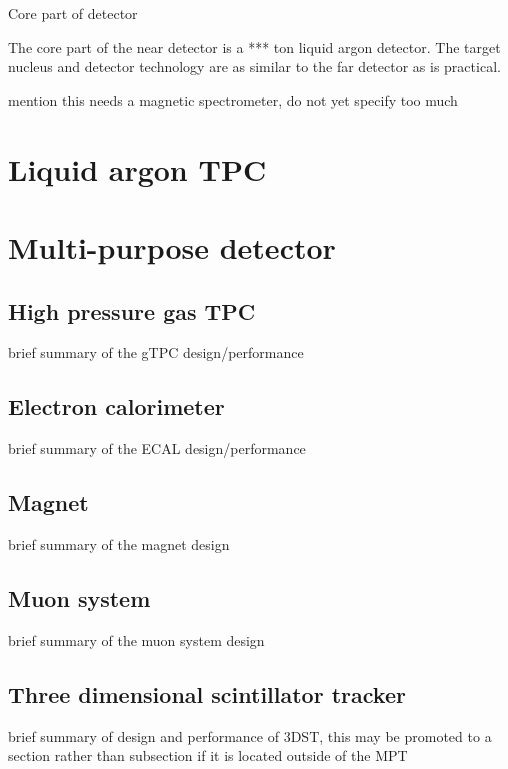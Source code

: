 Core part of detector

The core part of the near detector is a *** ton liquid argon detector.  The target nucleus and detector technology are as similar to the  far detector as is practical.

mention this needs a magnetic spectrometer, do not yet specify too much






\section{Liquid argon TPC}
\label{sec:exsum-nd-lartpc}
%


\section{Multi-purpose detector}
\label{sec:exsum-nd-mpt}
%

\subsection{High pressure gas TPC}
\label{ssec:exsum-nd-mpt-gtpc}
brief summary of the gTPC design/performance

\subsection{Electron calorimeter}
\label{ssec:exsum-nd-mpt-ecal}
brief summary of the ECAL design/performance

\subsection{Magnet}
\label{ssec:exsum-nd-mpt-magnet}
brief summary of the magnet design

\subsection{Muon system}
\label{ssec:exsum-nd-mpt-muon}
brief summary of the muon system design

\subsection{Three dimensional scintillator tracker}
\label{ssec:exsum-nd-mpt-3DST}
brief summary of design and performance of 3DST, this may be promoted to a section rather than subsection if it is located outside of the MPT

